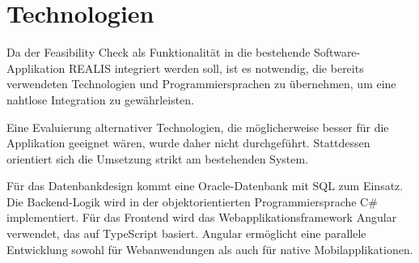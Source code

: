 \section{Technologien}

Da der Feasibility Check als Funktionalität in die bestehende Software-Applikation \gls{REALIS} integriert werden soll, ist es notwendig, die bereits verwendeten Technologien und Programmiersprachen zu übernehmen, um eine nahtlose Integration zu gewährleisten.

Eine Evaluierung alternativer Technologien, die möglicherweise besser für die Applikation geeignet wären, wurde daher nicht durchgeführt. Stattdessen orientiert sich die Umsetzung strikt am bestehenden System.

Für das Datenbankdesign kommt eine Oracle-Datenbank mit SQL zum Einsatz. Die Backend-Logik wird in der objektorientierten Programmiersprache C\# implementiert. Für das Frontend wird das Webapplikationsframework Angular verwendet, das auf TypeScript basiert. Angular ermöglicht eine parallele Entwicklung sowohl für Webanwendungen als auch für native Mobilapplikationen.